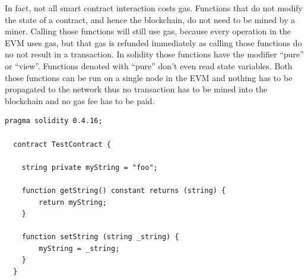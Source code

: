 In fact, not all smart contract interaction costs gas. Functions that do not modify the state of a contract, and hence the blockchain, do not need to be mined by a miner.
Calling those functions will still use gas, because every operation in the EVM uses gas, but that gas is refunded immediately as calling those functions do no not result in a transaction.
In solidity those functions have the modifier ``pure'' or ``view''. Functions denoted with ``pure'' don't even read state variables. Both those functions can be run on a single node in the EVM and 
nothing has to be propagated to the network thus no transaction has to be mined into the blockchain and no gas fee has to be paid.

	

\begin{lstlisting}[language=Solidity]
  pragma solidity 0.4.16;
  
  contract TestContract {
      
    string private myString = "foo";
    
    function getString() constant returns (string) {
        return myString;
    }
    
    function setString (string _string) {
        myString = _string;
    }
  }
  \end{lstlisting}